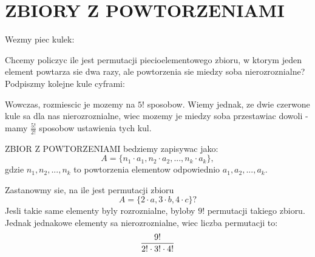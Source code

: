 \documentclass{article}
\begin{document}
\pagecolor{back}\color{txt}\ttfamily
\section*{ZBIORY Z POWTORZENIAMI}
Wezmy piec kulek:
\begin{center}
\end{center}
Chcemy policzyc ile jest permutacji piecioelementowego zbioru, w ktorym jeden element powtarza sie dwa razy, ale powtorzenia sie miedzy soba nierozroznialne? Podpiszmy kolejne kule cyframi:
\begin{center}
\end{center}
Wowczas, rozmiescic je mozemy na $5!$ sposobow. Wiemy jednak, ze dwie czerwone kule sa dla nas nierozroznialne, wiec mozemy je miedzy soba przestawiac dowoli - mamy \color{emp}$\frac{5!}{2!}$ \color{txt}sposobow ustawienia tych kul.\bigskip
\begin{center}
    \color{def}ZBIOR Z POWTORZENIAMI \color{txt}bedziemy zapisywac jako:
    $$A=\{n_1\cdot a_1, n_2\cdot a_2,..., n_k\cdot a_k\},$$
    gdzie $n_1, n_2, ..., n_k$ to powtorzenia elementow odpowiednio $a_1, a_2, ..., a_k$.
\end{center}\bigskip
Zastanowmy sie, na ile jest permutacji zbioru
$$A=\{2\cdot a, 3\cdot b, 4\cdot c\}?$$
Jesli takie same elementy byly rozroznialne, byloby $9!$ permutacji takiego zbioru. Jednak jednakowe elementy sa nierozroznialne, wiec liczba permutacji to:
$${9!\over 2!\cdot3!\cdot4!}$$
\end{document}
